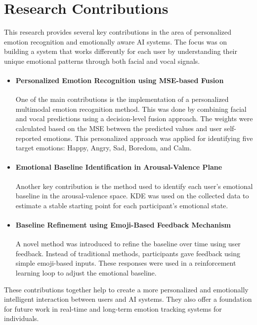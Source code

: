 \section{Research Contributions}
\label{sec:research-contributions}

\par This research provides several key contributions in the area of personalized emotion recognition and emotionally aware AI systems. The focus was on building a system that works differently for each user by understanding their unique emotional patterns through both facial and vocal signals.

\begin{itemize}
    \item \paragraph*{Personalized Emotion Recognition using MSE-based Fusion} One of the main contributions is the implementation of a personalized multimodal emotion recognition method. This was done by combining facial and vocal predictions using a decision-level fusion approach. The weights were calculated based on the MSE between the predicted values and user self-reported emotions. This personalized approach was applied for identifying five target emotions: Happy, Angry, Sad, Boredom, and Calm.

    \item \paragraph*{Emotional Baseline Identification in Arousal-Valence Plane} Another key contribution is the method used to identify each user's emotional baseline in the arousal-valence space. KDE was used on the collected data to estimate a stable starting point for each participant’s emotional state.

    \item \paragraph*{Baseline Refinement using Emoji-Based Feedback Mechanism} A novel method was introduced to refine the baseline over time using user feedback. Instead of traditional methods, participants gave feedback using simple emoji-based inputs. These responses were used in a reinforcement learning loop to adjust the emotional baseline.

\end{itemize}

\par These contributions together help to create a more personalized and emotionally intelligent interaction between users and AI systems. They also offer a foundation for future work in real-time and long-term emotion tracking systems for individuals.
